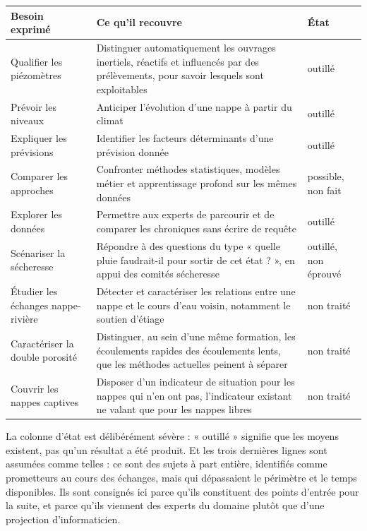\begin{center}
\begin{tabularx}{\textwidth}{@{}lXl@{}}
\toprule
\textbf{Besoin exprimé} & \textbf{Ce qu'il recouvre} & \textbf{État} \\
\midrule
Qualifier les piézomètres & Distinguer automatiquement les ouvrages inertiels, réactifs et
influencés par des prélèvements, pour savoir lesquels sont exploitables & outillé \\
Prévoir les niveaux & Anticiper l'évolution d'une nappe à partir du climat & outillé \\
Expliquer les prévisions & Identifier les facteurs déterminants d'une prévision donnée &
outillé \\
Comparer les approches & Confronter méthodes statistiques, modèles métier et apprentissage
profond sur les mêmes données & possible, non fait \\
Explorer les données & Permettre aux experts de parcourir et de comparer les chroniques sans
écrire de requête & outillé \\
Scénariser la sécheresse & Répondre à des questions du type « quelle pluie faudrait-il pour
sortir de cet état ? », en appui des comités sécheresse & outillé, non éprouvé \\
Étudier les échanges nappe-rivière & Détecter et caractériser les relations entre une nappe et
le cours d'eau voisin, notamment le soutien d'étiage & non traité \\
Caractériser la double porosité & Distinguer, au sein d'une même formation, les écoulements
rapides des écoulements lents, que les méthodes actuelles peinent à séparer & non traité \\
Couvrir les nappes captives & Disposer d'un indicateur de situation pour les nappes qui n'en ont
pas, l'indicateur existant ne valant que pour les nappes libres & non traité \\
\bottomrule
\end{tabularx}
\end{center}

La colonne d'état est délibérément sévère : « outillé » signifie
que les moyens existent, pas qu'un résultat a été produit. Et les trois dernières lignes sont
assumées comme telles : ce sont des sujets à part entière, identifiés comme prometteurs au cours
des échanges, mais qui dépassaient le périmètre et le temps disponibles. Ils sont consignés ici
parce qu'ils constituent des points d'entrée pour la suite, et parce qu'ils viennent des experts
du domaine plutôt que d'une projection d'informaticien.

